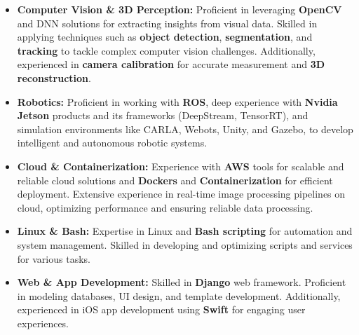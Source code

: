 \documentclass[10pt]{res}
\begin{document}
\begin{resume}
\begin{itemize}
\item {\bf Computer Vision \& 3D Perception:} Proficient in leveraging \textbf{OpenCV} and DNN solutions for extracting insights from visual data. Skilled in applying techniques such as \textbf{object detection}, \textbf{segmentation}, and \textbf{tracking} to tackle complex computer vision challenges. Additionally, experienced in \textbf{camera calibration} for accurate measurement and \textbf{3D reconstruction}.

\item {\bf Robotics:} Proficient in working with \textbf{ROS}, deep experience with \textbf{Nvidia Jetson} products and its frameworks (DeepStream, TensorRT), and simulation environments like CARLA, Webots, Unity, and Gazebo, to develop intelligent and autonomous robotic systems.

\item {\bf Cloud \& Containerization:} Experience with \textbf{AWS} tools for scalable and reliable cloud solutions and \textbf{Dockers} and \textbf{Containerization} for efficient deployment. Extensive experience in real-time image processing pipelines on cloud, optimizing performance and ensuring reliable data processing.

\item {\bf Linux \& Bash:} Expertise in Linux and \textbf{Bash scripting} for automation and system management. Skilled in developing and optimizing scripts and services for various tasks.

\item {\bf Web \& App Development:} Skilled in \textbf{Django} web framework. Proficient in modeling databases, UI design, and template development. Additionally, experienced in iOS app development using \textbf{Swift} for engaging user experiences.

\end{itemize}




\end{resume}
\end{document}

